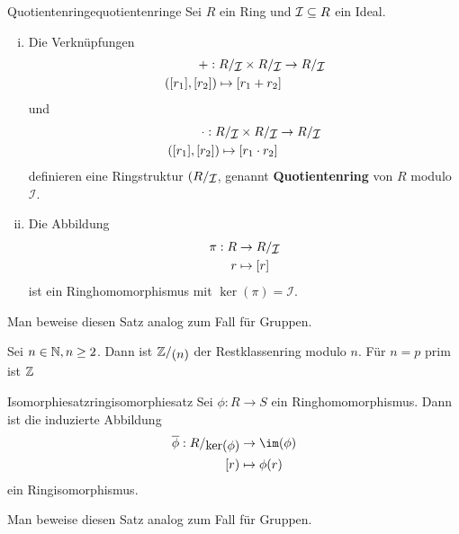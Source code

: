 \begin{satz}{Quotientenringe}{quotientenringe}
Sei $R$ ein Ring und $\mathcal{I} \subseteq R$ ein Ideal.
\begin{enumerate}[(i)]
\item Die Verknüpfungen 
\begin{equation}
\begin{split}
+: \quotient{R}{\mathcal{I}} \times \quotient{R}{\mathcal{I}} &\to \quotient{R}{\mathcal{I}}\\
([r_1], [r_2]) \mapsto [r_1 + r_2]
\end{split}
\end{equation}
und
\begin{equation}
\begin{split}
\cdot: \quotient{R}{\mathcal{I}} \times \quotient{R}{\mathcal{I}} &\to \quotient{R}{\mathcal{I}}\\
([r_1], [r_2]) \mapsto [r_1 \cdot r_2]
\end{split}
\end{equation}
definieren eine Ringstruktur $(\quotient{R}{\mathcal{I}}$, genannt \textbf{Quotientenring} von $R$ modulo $\mathcal{I}$.
\item Die Abbildung 
\begin{equation}
\begin{split}
\pi: R &\to \quotient{R}{\mathcal{I}}\\
r &\mapsto [r]
\end{split}
\end{equation}
ist ein Ringhomomorphismus mit $\ker (\pi) = \mathcal{I}$.
\end{enumerate}
\end{satz}
\begin{übung}
Man beweise diesen Satz analog zum Fall für Gruppen.
\end{übung}
\begin{beispiel}
Sei $n \in \mathbb{N}, n \geq 2$. Dann ist $\quotient{\Z}{(n)}$ der Restklassenring modulo $n$. Für $n=p$ prim ist $\mathbb{Z}$
\end{beispiel}
\begin{theorem}{Isomorphiesatz}{ringisomorphiesatz}
Sei $\phi: R \to S$ ein Ringhomomorphismus. Dann ist die induzierte Abbildung
\begin{equation}
\begin{split}
\overline{\phi}: \quotient{R}{\ker (\phi)} &\to \im (\phi)\\
[r) &\mapsto \phi(r)
\end{split}
\end{equation}
ein Ringisomorphismus.
\end{theorem}
\begin{übung}
Man beweise diesen Satz analog zum Fall für Gruppen.
\end{übung}

